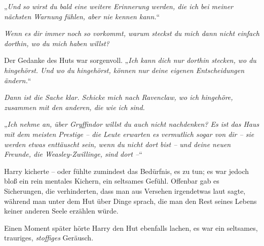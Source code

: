 „\emph{Und so wirst du bald eine weitere Erinnerung werden, die ich bei meiner nächsten Warnung fühlen, aber nie kennen kann.}“

\emph{Wenn es dir immer noch so vorkommt, warum steckst du mich dann nicht einfach dorthin, wo du mich haben willst?}

Der Gedanke des Huts war sorgenvoll. „\emph{Ich kann dich nur dorthin stecken, wo du hingehörst. Und wo du hingehörst, können nur deine eigenen Entscheidungen ändern.}“

\emph{Dann ist die Sache klar. Schicke mich nach Ravenclaw, wo ich hingehöre, zusammen mit den anderen, die wie ich sind. }

„\emph{Ich nehme an, über Gryffindor willst du auch nicht nachdenken? Es ist das Haus mit dem meisten Prestige – die Leute erwarten es vermutlich sogar von dir – sie werden etwas enttäuscht sein, wenn du nicht dort bist – und deine neuen Freunde, die Weasley-Zwillinge, sind dort –}“

Harry kicherte – oder fühlte zumindest das Bedürfnis, es zu tun; es war jedoch bloß ein rein mentales Kichern, ein seltsames Gefühl. Offenbar gab es Sicherungen, die verhinderten, dass man aus Versehen irgendetwas laut sagte, während man unter dem Hut über Dinge sprach, die man den Rest seines Lebens keiner anderen Seele erzählen würde.

Einen Moment später hörte Harry den Hut ebenfalls lachen, es war ein seltsames, trauriges, \emph{stoffiges} Geräusch.

